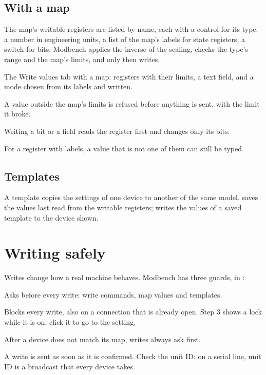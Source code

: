 \subsection{With a map}

The map's writable registers are listed by name, each with a control for its
type: a number in engineering units, a list of the map's labels for state
registers, a switch for bits. Modbench applies the inverse of the scaling,
checks the type's range and the map's limits, and only then writes.

  {The Write values tab with a map: registers with their limits, a text field,
   and a mode chosen from its labels and written.}

\begin{description}[style=nextline, leftmargin=0pt, font=\intermedium]
  \item[Limits] A value outside the map's limits is refused before anything
    is sent, with the limit it broke.
  \item[Bit fields] Writing a bit or a field reads the register first and
    changes only its bits.
  \item[Custom values] For a register with labels, a value that is not one of
    them can still be typed.
\end{description}

\subsection{Templates}

A template copies the settings of one device to another of the same model.
 saves the values last read from the writable registers;
 writes the values of a saved template to the device shown.

\section{Writing safely}

Writes change how a real machine behaves. Modbench has three guards, in
:

\begin{description}[style=nextline, leftmargin=0pt, font=\intermedium]
  \item[Confirm before writing to a device] Asks before every write: write
    commands, map values and templates.
  \item[Read-only mode] Blocks every write, also on a connection that is
    already open. Step 3 shows a lock while it is on; click it to go to the
    setting.
  \item[Map mismatch] After a device does not match its map, writes always ask
    first.
\end{description}

\begin{warning}
A write is sent as soon as it is confirmed. Check the unit ID: on a serial
line, unit ID  is a broadcast that every device takes.
\end{warning}
